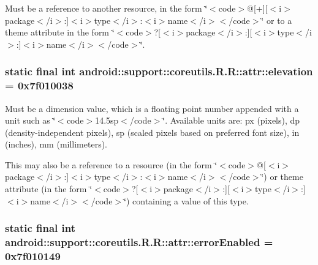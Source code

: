 Must be a reference to another resource, in the form \char`\"{}$<$code$>$@\mbox{[}+\mbox{]}\mbox{[}$<$i$>$package$<$/i$>$:\mbox{]}$<$i$>$type$<$/i$>$:$<$i$>$name$<$/i$>$$<$/code$>$\char`\"{} or to a theme attribute in the form \char`\"{}$<$code$>$?\mbox{[}$<$i$>$package$<$/i$>$:\mbox{]}\mbox{[}$<$i$>$type$<$/i$>$:\mbox{]}$<$i$>$name$<$/i$>$$<$/code$>$\char`\"{}. \hypertarget{classandroid_1_1support_1_1coreutils_1_1_r_1_1attr_2f73c60c1d6285a5a55b5e68c4c77abb}{
\subsubsection[{elevation}]{\setlength{\rightskip}{0pt plus 5cm}static final int android::support::coreutils.R.R::attr::elevation = 0x7f010038}}
\label{classandroid_1_1support_1_1coreutils_1_1_r_1_1attr_2f73c60c1d6285a5a55b5e68c4c77abb}


Must be a dimension value, which is a floating point number appended with a unit such as \char`\"{}$<$code$>$14.5sp$<$/code$>$\char`\"{}. Available units are: px (pixels), dp (density-independent pixels), sp (scaled pixels based on preferred font size), in (inches), mm (millimeters). 

This may also be a reference to a resource (in the form \char`\"{}$<$code$>$@\mbox{[}$<$i$>$package$<$/i$>$:\mbox{]}$<$i$>$type$<$/i$>$:$<$i$>$name$<$/i$>$$<$/code$>$\char`\"{}) or theme attribute (in the form \char`\"{}$<$code$>$?\mbox{[}$<$i$>$package$<$/i$>$:\mbox{]}\mbox{[}$<$i$>$type$<$/i$>$:\mbox{]}$<$i$>$name$<$/i$>$$<$/code$>$\char`\"{}) containing a value of this type. \hypertarget{classandroid_1_1support_1_1coreutils_1_1_r_1_1attr_e490dd76d90a5dccf7340af17bf85485}{
\subsubsection[{errorEnabled}]{\setlength{\rightskip}{0pt plus 5cm}static final int android::support::coreutils.R.R::attr::errorEnabled = 0x7f010149}}
\label{classandroid_1_1support_1_1coreutils_1_1_r_1_1attr_e490dd76d90a5dccf7340af17bf85485}


